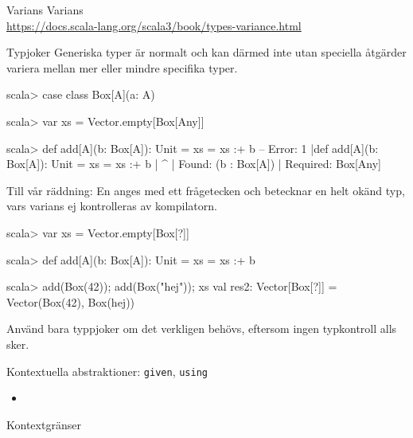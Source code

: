 
\begin{Slide}{Varians}
  \TODO Varians \\ \url{https://docs.scala-lang.org/scala3/book/types-variance.html}
\end{Slide}

\begin{Slide}{Typjoker }\SlideFontSmall
Generiska typer är normalt  och kan därmed inte utan speciella åtgärder variera mellan mer eller mindre specifika typer. %
\begin{REPLsmall}
scala> case class Box[A](a: A)

scala> var xs = Vector.empty[Box[Any]]

scala> def add[A](b: Box[A]): Unit = xs = xs :+ b
-- Error:
1 |def add[A](b: Box[A]): Unit = xs = xs :+ b
  |                                         ^
  |                                         Found:    (b : Box[A])
  |                                         Required: Box[Any]
\end{REPLsmall}  
Till vår räddning: En   anges med ett frågetecken och betecknar en helt okänd typ, vars varians ej kontrolleras av kompilatorn.
\begin{REPLsmall}
scala> var xs = Vector.empty[Box[?]]

scala> def add[A](b: Box[A]): Unit = xs = xs :+ b

scala> add(Box(42)); add(Box("hej")); xs
val res2: Vector[Box[?]] = Vector(Box(42), Box(hej))
\end{REPLsmall}
Använd bara typpjoker om det verkligen behövs, eftersom ingen typkontroll alls sker.
\end{Slide}




 
\begin{Slide}{Kontextuella abstraktioner: \texttt{given}, \texttt{using}}\SlideFontSmall
\begin{itemize}\SlideFontTiny
\item \TODO {} 
\end{itemize}
\end{Slide}

\begin{Slide}{Kontextgränser}
\TODO {}
\end{Slide}





